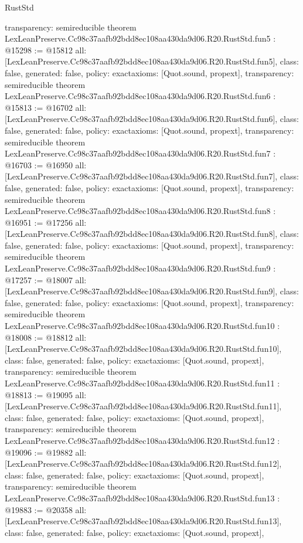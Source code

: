 \begin{lexlean}{RustStd}
\begin{coremodule}
{  transparency: semireducible
}
theorem LexLeanPreserve.Cc98c37aafb92bdd8ec108aa430da9d06.R20.RustStd.fun5 : @15298 := @15812 {
  all: [LexLeanPreserve.Cc98c37aafb92bdd8ec108aa430da9d06.R20.RustStd.fun5],
  class: false,
  generated: false,
  policy: exact{axioms: [Quot.sound, propext]},
  transparency: semireducible
}
theorem LexLeanPreserve.Cc98c37aafb92bdd8ec108aa430da9d06.R20.RustStd.fun6 : @15813 := @16702 {
  all: [LexLeanPreserve.Cc98c37aafb92bdd8ec108aa430da9d06.R20.RustStd.fun6],
  class: false,
  generated: false,
  policy: exact{axioms: [Quot.sound, propext]},
  transparency: semireducible
}
theorem LexLeanPreserve.Cc98c37aafb92bdd8ec108aa430da9d06.R20.RustStd.fun7 : @16703 := @16950 {
  all: [LexLeanPreserve.Cc98c37aafb92bdd8ec108aa430da9d06.R20.RustStd.fun7],
  class: false,
  generated: false,
  policy: exact{axioms: [Quot.sound, propext]},
  transparency: semireducible
}
theorem LexLeanPreserve.Cc98c37aafb92bdd8ec108aa430da9d06.R20.RustStd.fun8 : @16951 := @17256 {
  all: [LexLeanPreserve.Cc98c37aafb92bdd8ec108aa430da9d06.R20.RustStd.fun8],
  class: false,
  generated: false,
  policy: exact{axioms: [Quot.sound, propext]},
  transparency: semireducible
}
theorem LexLeanPreserve.Cc98c37aafb92bdd8ec108aa430da9d06.R20.RustStd.fun9 : @17257 := @18007 {
  all: [LexLeanPreserve.Cc98c37aafb92bdd8ec108aa430da9d06.R20.RustStd.fun9],
  class: false,
  generated: false,
  policy: exact{axioms: [Quot.sound, propext]},
  transparency: semireducible
}
theorem LexLeanPreserve.Cc98c37aafb92bdd8ec108aa430da9d06.R20.RustStd.fun10 : @18008 := @18812 {
  all: [LexLeanPreserve.Cc98c37aafb92bdd8ec108aa430da9d06.R20.RustStd.fun10],
  class: false,
  generated: false,
  policy: exact{axioms: [Quot.sound, propext]},
  transparency: semireducible
}
theorem LexLeanPreserve.Cc98c37aafb92bdd8ec108aa430da9d06.R20.RustStd.fun11 : @18813 := @19095 {
  all: [LexLeanPreserve.Cc98c37aafb92bdd8ec108aa430da9d06.R20.RustStd.fun11],
  class: false,
  generated: false,
  policy: exact{axioms: [Quot.sound, propext]},
  transparency: semireducible
}
theorem LexLeanPreserve.Cc98c37aafb92bdd8ec108aa430da9d06.R20.RustStd.fun12 : @19096 := @19882 {
  all: [LexLeanPreserve.Cc98c37aafb92bdd8ec108aa430da9d06.R20.RustStd.fun12],
  class: false,
  generated: false,
  policy: exact{axioms: [Quot.sound, propext]},
  transparency: semireducible
}
theorem LexLeanPreserve.Cc98c37aafb92bdd8ec108aa430da9d06.R20.RustStd.fun13 : @19883 := @20358 {
  all: [LexLeanPreserve.Cc98c37aafb92bdd8ec108aa430da9d06.R20.RustStd.fun13],
  class: false,
  generated: false,
  policy: exact{axioms: [Quot.sound, propext]},
}
\end{coremodule}
\end{lexlean}
